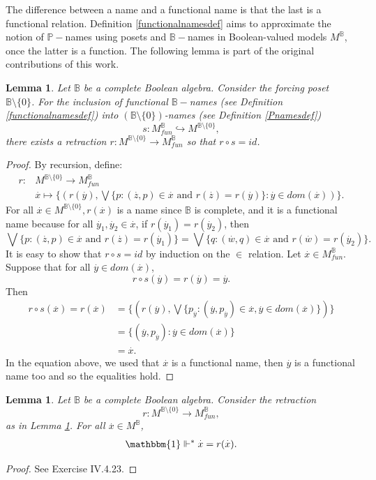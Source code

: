 \documentclass[10pt,longbibliography]{article}
\newtheorem{Lemma}[Theo]{Lemma}
\newcommand{\One}{\mathbbm{1}}
\newcommand{\Po}{\mathbb{P}}
\newcommand{\B}{\mathbb{B}}
\newcommand{\ydot}{\overset{.}{y}}
\newcommand{\zdot}{\overset{.}{z}}
\newcommand{\xdot}{\overset{.}{x}}
\newcommand{\wdot}{\overset{.}{w}}
\newcommand{\forces}{\Vdash^{*}}
\begin{document}
The difference between a name and a functional name is that the last is a functional relation. Definition \ref{functionalnamesdef} aims to approximate the notion of $\Po-$names using posets and $\B-$names in Boolean-valued models $M^\B$, once the latter is a function. The following lemma is part of the original contributions of this work.
\begin{Lemma}\label{retractdef}
	Let $\B$ be a complete Boolean algebra. Consider the forcing poset $\B \setminus \{0\} $. For the inclusion of functional $\B-$names  (see Definition \ref{functionalnamesdef}) into 
	$(\B \setminus \{0\})$-names {(see Definition \ref{Pnamesdef})}
	$$s: M^{\B}_{fun} \hookrightarrow M^{\B\setminus \{0\}},$$ 
	there exists a retraction $r: M^{\B \setminus \{0\}} \to M^{\B}_{fun}$ so that $r \circ s = id$.
\end{Lemma}
\begin{proof}
	By recursion, define:
	\begin{align*}
		r: &M^{\B\setminus \{0\}} \to M^{\B}_{fun} \\
		& \xdot \mapsto \{ (r(\ydot), \bigvee \{ p: (\zdot, p) \in \xdot \text{ and } r(\zdot) = r(\ydot)\}: \ydot \in dom(\xdot)) \}.
	\end{align*}
	For all $\xdot \in M^{\B\setminus \{0\}}, r(\xdot)$ is a name since $\B$ is complete, and it is a functional name because for all $\ydot_{1},\ydot_{2} \in \xdot$, if $r(\ydot_{1}) = r(\ydot_{2})$, then 
	$$\bigvee \{ p: (\zdot,p) \in \xdot \text{ and }r(\zdot) = r(\ydot_{1}) \}= \bigvee \{q: (\wdot,q) \in \xdot \text{ and } r(\wdot)= r(\ydot_{2})\}.$$
	It is easy to show that $r \circ s = id$ by induction on the $\in$ relation. Let $\xdot \in M^{\B}_{fun}$. Suppose that for all $\ydot \in dom(\xdot)$, $$r \circ s (\ydot) = r (\ydot) = \ydot.$$
	Then
	\begin{align*}
		r \circ s(\xdot)= r(\xdot) &= \{ (r(\ydot),\bigvee \{p_{\ydot}: (\ydot,p_{\ydot}) \in \xdot, \ydot \in dom(\xdot)  \})\}\\
		&= \{(\ydot,p_{\ydot}): \ydot \in dom(\xdot) \} \\
		&= \xdot.
	\end{align*}
In the equation above, we used that $\xdot$ is a functional name, then $\ydot$ is a functional name too and so the equalities hold.
\end{proof}

\begin{Lemma}
	Let $\B$ be a complete Boolean algebra. Consider the retraction $$r: M^{\B \setminus \{0\}} \to M^{\B}_{fun},$$ as in Lemma \ref{retractdef}. For all $\xdot \in M^{\B}$,
	$$\One \forces \xdot = r(\xdot).$$
\end{Lemma}
\begin{proof}
	See \cite{Kunen11} Exercise IV.4.23.
\end{proof}
\end{document}
